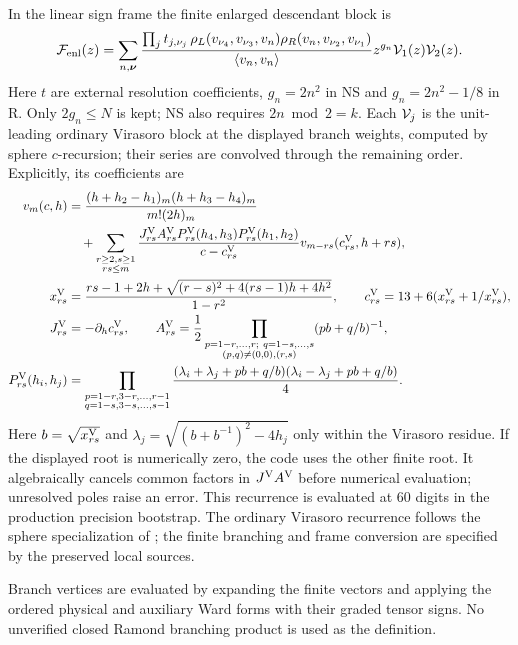 \documentclass[11pt]{article}
\newcommand{\F}{\mathcal F}
\begin{document}
In the linear sign frame the finite enlarged descendant block is
\begin{equation}
 \F_{\rm enl}(z)=\sum_{n,\bm\nu}
 \frac{\prod_jt_{j,\nu_j}\,
 \rho_L(v_{\nu_4},v_{\nu_3},v_n)
 \rho_R(v_n,v_{\nu_2},v_{\nu_1})}{\langle v_n,v_n\rangle}
 z^{g_n}{\cal V}_1(z){\cal V}_2(z).
 \label{eq:branch-sum}
\end{equation}
Here \(t\) are external resolution coefficients,
\(g_n=2n^2\) in NS and \(g_n=2n^2-1/8\) in R.
Only \(2g_n\le N\) is kept; NS also requires \(2n\bmod2=k\).
Each \({\cal V}_j\) is the unit-leading ordinary Virasoro block at
the displayed branch weights, computed by sphere \(c\)-recursion;
their series are convolved through the remaining order.
Explicitly, its coefficients are
\begin{align}
 v_m(c,h)&=\frac{(h+h_2-h_1)_m(h+h_3-h_4)_m}{m!(2h)_m}\nonumber\\
 &\quad+\sum_{\substack{r\ge2,s\ge1\\rs\le m}}
 \frac{J^{\rm V}_{rs}A^{\rm V}_{rs}
 P^{\rm V}_{rs}(h_4,h_3)P^{\rm V}_{rs}(h_1,h_2)}{c-c^{\rm V}_{rs}}
 v_{m-rs}(c^{\rm V}_{rs},h+rs),\\
 x^{\rm V}_{rs}&=
 \frac{rs-1+2h+\sqrt{(r-s)^2+4(rs-1)h+4h^2}}{1-r^2},\qquad
 c^{\rm V}_{rs}=13+6(x^{\rm V}_{rs}+1/x^{\rm V}_{rs}),\\
 J^{\rm V}_{rs}&=-\partial_h c^{\rm V}_{rs},\qquad
 A^{\rm V}_{rs}=\frac12
 \prod_{\substack{p=1-r,\ldots,r;\ q=1-s,\ldots,s\\
 (p,q)\ne(0,0),(r,s)}}(pb+q/b)^{-1},\\
 P^{\rm V}_{rs}(h_i,h_j)&=
 \prod_{\substack{p=1-r,3-r,\ldots,r-1\\q=1-s,3-s,\ldots,s-1}}
 \frac{(\lambda_i+\lambda_j+pb+q/b)(\lambda_i-\lambda_j+pb+q/b)}4.
\end{align}
Here \(b=\sqrt{x^{\rm V}_{rs}}\) and
\(\lambda_j=\sqrt{(b+b^{-1})^2-4h_j}\) only within the Virasoro
residue. If the displayed root is numerically zero, the code uses
the other finite root. It algebraically cancels common factors in
\(J^{\rm V}A^{\rm V}\) before numerical evaluation; unresolved poles
raise an error. This recurrence is evaluated at 60 digits in the
production precision bootstrap.
The ordinary Virasoro recurrence follows the sphere specialization
of \cite{CCY}; the finite branching and frame conversion are specified
by the preserved local sources.

Branch vertices are evaluated by expanding the finite vectors and
applying the ordered physical and auxiliary Ward forms with their
graded tensor signs. No unverified closed Ramond branching product
is used as the definition.
\end{document}
